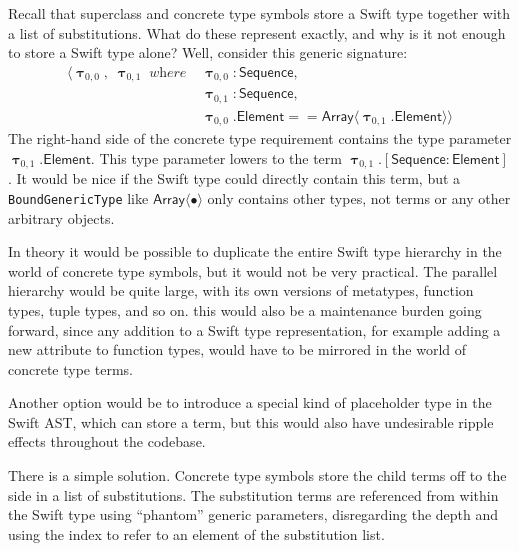 \documentclass[a4paper,headsepline,bibliography=totoc,toc=flat,fleqn,twoside=semi]{scrbook}
\theoremstyle{definition}
\theoremstyle{definition}
\theoremstyle{definition}
\newcommand{\namesym}[1]{\mathsf{#1}}
\newcommand{\proto}[1]{\bm{\mathsf{#1}}}
\newcommand{\gensig}[2]{\langle #1\;\textit{where}\;#2\rangle}
\newcommand{\genericsym}[2]{\bm{\uptau}_{#1,#2}}
\newcommand{\assocsym}[2]{[\proto{#1}\colon\namesym{#2}]}
\begin{document}
Recall that superclass and concrete type symbols store a Swift type together with a list of substitutions. What do these represent exactly, and why is it not enough to store a Swift type alone? Well, consider this generic signature:
\begin{align*}
\gensig{\genericsym{0}{0},\;\genericsym{0}{1}}
{
&\genericsym{0}{0}\colon\proto{Sequence},\\
&\genericsym{0}{1}\colon\proto{Sequence},\\
&\genericsym{0}{0}.\namesym{Element}==
\namesym{Array}\langle\genericsym{0}{1}.\namesym{Element}\rangle
}
\end{align*}
The right-hand side of the concrete type requirement contains the type parameter $\genericsym{0}{1}.\namesym{Element}$. This type parameter lowers to the term $\genericsym{0}{1}.\assocsym{Sequence}{Element}$. It would be nice if the Swift type could directly contain this term, but a \texttt{BoundGenericType} like $\namesym{Array}\langle\bullet\rangle$ only contains other types, not terms or any other arbitrary objects.

In theory it would be possible to duplicate the entire Swift type hierarchy in the world of concrete type symbols, but it would not be very practical. The parallel hierarchy would be quite large, with its own versions of metatypes, function types, tuple types, and so on. this would also be a maintenance burden going forward, since any addition to a Swift type representation, for example adding a new attribute to function types, would have to be mirrored in the world of concrete type terms.

Another option would be to introduce a special kind of placeholder type in the Swift AST, which can store a term, but this would also have undesirable ripple effects throughout the codebase.

There is a simple solution. Concrete type symbols store the child terms off to the side in a list of substitutions. The substitution terms are referenced from within the Swift type using ``phantom'' generic parameters, disregarding the depth and using the index to refer to an element of the substitution list.
\end{document}
